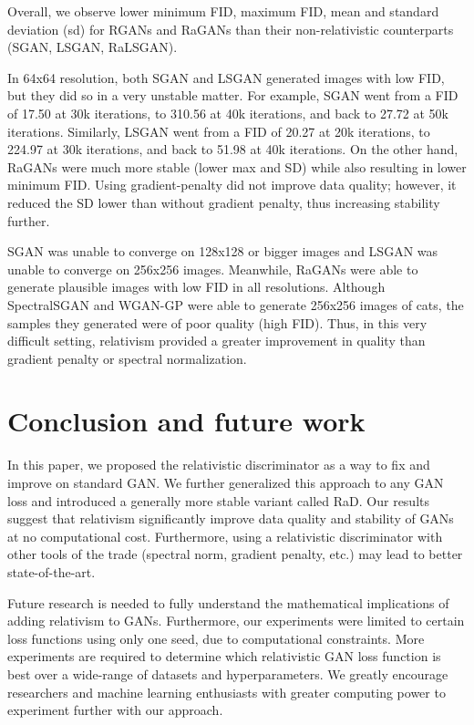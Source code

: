 \documentclass{article}
\begin{document}
Overall, we observe lower minimum FID, maximum FID, mean and standard deviation (sd) for RGANs and RaGANs than their non-relativistic counterparts (SGAN, LSGAN, RaLSGAN).

In 64x64 resolution, both SGAN and LSGAN generated images with low FID, but they did so in a very unstable matter. For example, SGAN went from a FID of 17.50 at 30k iterations, to 310.56 at 40k iterations, and back to 27.72 at 50k iterations. Similarly, LSGAN went from a FID of 20.27 at 20k iterations, to 224.97 at 30k iterations, and back to 51.98 at 40k iterations. On the other hand, RaGANs were much more stable (lower max and SD) while also resulting in lower minimum FID. Using gradient-penalty did not improve data quality; however, it reduced the SD lower than without gradient penalty, thus increasing stability further.

SGAN was unable to converge on 128x128 or bigger images and LSGAN was unable to converge on 256x256 images. Meanwhile, RaGANs were able to generate plausible images with low FID in all resolutions. Although SpectralSGAN and WGAN-GP were able to generate 256x256 images of cats, the samples they generated were of poor quality (high FID). Thus, in this very difficult setting, relativism provided a greater improvement in quality than gradient penalty or spectral normalization.

\section{Conclusion and future work}

In this paper, we proposed the relativistic discriminator as a way to fix and improve on standard GAN. We further generalized this approach to any GAN loss and introduced a generally more stable variant called RaD. Our results suggest that relativism significantly improve data quality and stability of GANs at no computational cost. Furthermore, using a relativistic discriminator with other tools of the trade (spectral norm, gradient penalty, etc.) may lead to better state-of-the-art. 

Future research is needed to fully understand the mathematical implications of adding relativism to GANs. Furthermore, our experiments were limited to certain loss functions using only one seed, due to computational constraints. More experiments are required to determine which relativistic GAN loss function is best over a wide-range of datasets and hyperparameters. We greatly encourage researchers and machine learning enthusiasts with greater computing power to experiment further with our approach.
\end{document}
